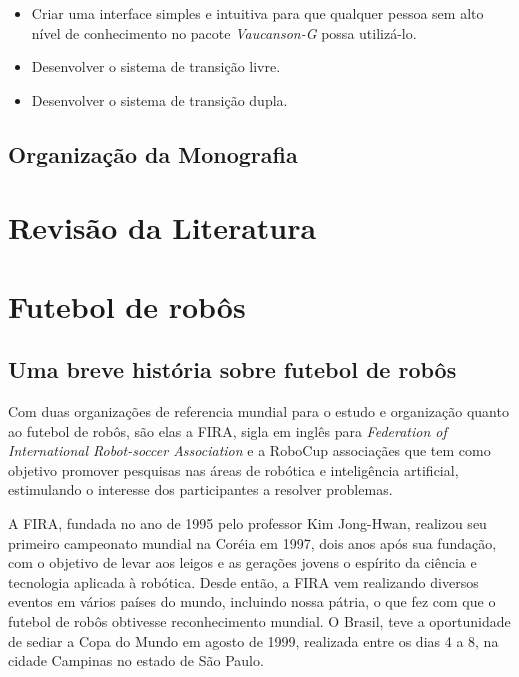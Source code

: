 \documentclass[a4paper,12pt,portuguese]{ufms-cpcx}
\begin{document}
\begin{itemize}
	
	\item Criar uma interface simples e intuitiva para que qualquer pessoa sem alto nível de conhecimento no pacote \textit{Vaucanson-G} possa utilizá-lo.
	
	\item Desenvolver o sistema de transição livre.
	
	\item Desenvolver o sistema de transição dupla.
	
	
\end{itemize}

\section {Organização da Monografia}

\chapter{Revisão da Literatura}

\chapter{Futebol de robôs}
%

\section{Uma breve história sobre futebol de robôs}
Com duas organizações de referencia mundial para o estudo e organização quanto ao futebol de robôs, são elas a FIRA, sigla em inglês para \textit{Federation of International Robot-soccer Association} e a RoboCup associaçães que tem como objetivo promover pesquisas nas áreas de robótica e inteligência artificial, estimulando o interesse dos participantes a resolver problemas. 

A FIRA, fundada no ano de 1995 pelo professor Kim Jong-Hwan, realizou seu primeiro campeonato mundial na Coréia em 1997, dois anos após sua fundação, com o objetivo de levar aos leigos e as gerações jovens o espírito da ciência e tecnologia aplicada à robótica. Desde então, a FIRA vem realizando diversos eventos em vários
países do mundo, incluindo nossa pátria, o que fez com que o futebol de robôs obtivesse reconhecimento mundial. O Brasil, teve a oportunidade de sediar a Copa do Mundo em agosto de 1999, realizada entre os dias 4 a 8, na cidade Campinas no estado de São Paulo.
\end{document}
